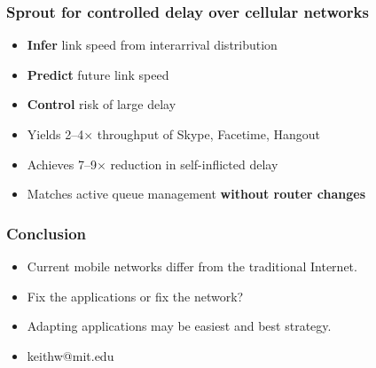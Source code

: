 \documentclass[svgnames]{beamer}
\begin{document}
\begin{frame}
\frametitle{Sprout for controlled delay over cellular networks}

\begin{itemize}
\item \textbf{Infer} link speed from interarrival distribution

\item \textbf{Predict} future link speed

\item \textbf{Control} risk of large delay

\item Yields 2--4$\times$ throughput of Skype, Facetime, Hangout

\item Achieves 7--9$\times$ reduction in self-inflicted delay

\item Matches active queue management \textbf{without router changes}

\end{itemize}

\end{frame}

\begin{frame}
\frametitle{Conclusion}

\begin{itemize}

\item Current mobile networks differ from the traditional Internet.

\item Fix the applications or fix the network?

\item Adapting applications may be easiest and best strategy.

\item keithw@mit.edu

\end{itemize}

\end{frame}
\end{document}
